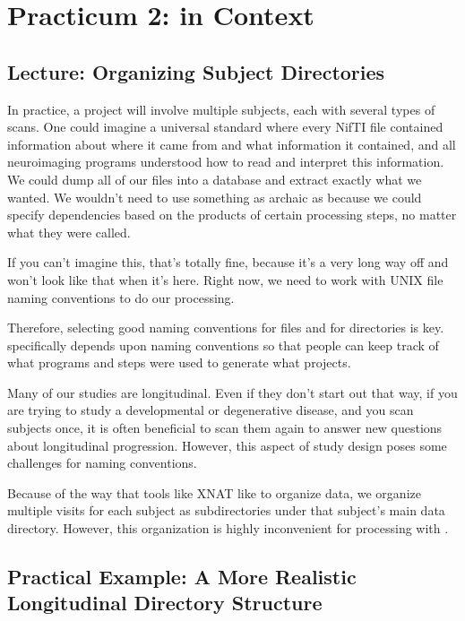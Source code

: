\chapter*{Practicum 2: \maken{} in Context}
\label{sec:practicum2}
\section{Lecture: Organizing Subject Directories}

In practice, a project will involve multiple subjects, each with
several types of scans. One could imagine a universal standard where
every NifTI file contained information about where it came from and
what information it contained, and all neuroimaging programs
understood how to read and interpret this information. We could dump
all of our files into a database and extract exactly what we
wanted. We wouldn't need to use something as archaic as \maken{} because
we could specify dependencies based on the products of certain
processing steps, no matter what they were called.

If you can't imagine this, that's totally fine, because it's a very
long way off and won't look like that when it's here. Right now, we
need to work with UNIX file naming conventions to do our processing.

Therefore, selecting good naming conventions for files and for
directories is key. \maken{} specifically depends upon naming
conventions so that people can keep track of what programs and steps
were used to generate what projects.


Many of our studies are longitudinal. Even if they don't start out
that way, if you are trying to study a developmental or degenerative
disease, and you scan subjects once, it is often beneficial to scan
them again to answer new questions about longitudinal
progression. However, this aspect of study design poses some
challenges for naming conventions. 

Because of the way that tools like XNAT like to organize data, we
organize multiple visits for each subject as subdirectories under that
subject's main data directory. However, this organization is highly
inconvenient for processing with \maken{}.  


\section{Practical Example: A More Realistic Longitudinal Directory Structure}

